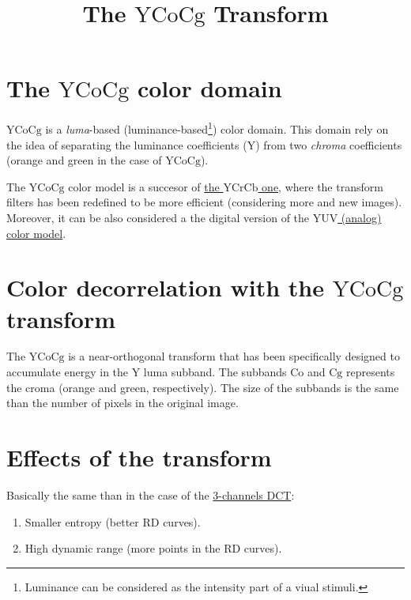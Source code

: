 
\title{The $\text{YCoCg}$ Transform}
\maketitle

\tableofcontents

\section{The $\text{YCoCg}$ color domain}
$\text{YCoCg}$ is a \emph{luma}-based
(luminance-based\footnote{Luminance can be considered as the intensity
part of a viual stimuli.}) color domain. This domain rely on the idea
of separating the luminance coefficients (Y) from two \emph{chroma}
coefficients (orange and green in the case of $\text{YCoCg}$).

The $\text{YCoCg}$ color model is a succesor of
\href{https://vicente-gonzalez-ruiz.github.io/color_transforms/docs/YCrCb/HTML/}{the
  $\text{YCrCb}$ one}, where the transform filters has been redefined
to be more efficient (considering more and new images). Moreover, it
can be also considered a the digital version of the
\href{https://en.wikipedia.org/wiki/YUV}{$\text{YUV}$ (analog) color
  model}.

\section{Color decorrelation with the $\text{YCoCg}$ transform}
The $\text{YCoCg}$ is a near-orthogonal transform that has been
specifically designed to accumulate energy in the $\text{Y}$ luma
subband. The subbands $\text{Co}$ and $\text{Cg}$ represents the croma
(orange and green, respectively). The size of the subbands is the same
than the number of pixels in the original image.

\section{Effects of the transform}
Basically the same than in the case of the
\href{https://vicente-gonzalez-ruiz.github.io/color_transforms/docs/3DCT/HTML/}{3-channels
  DCT}:
\begin{enumerate}
\item Smaller entropy (better RD curves).
\item High dynamic range (more points in the RD curves).
\end{enumerate}

